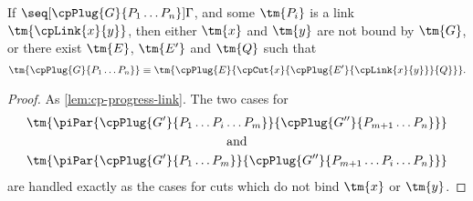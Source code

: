\begin{lemma}\label{lem:hcp-progress-link}
  If $\seq[{ \cpPlug{G}{P_1 \dots P_n} }]{ \Gamma }$, and some $\tm{P_i}$ is a
  link $\tm{\cpLink{x}{y}}$, then either $\tm{x}$ and $\tm{y}$ are not bound by
  $\tm{G}$, or there exist $\tm{E}$, $\tm{E'}$ and $\tm{Q}$ such that
  \begin{gather*}
    \tm{\cpPlug{G}{P_1 \dots P_n}} \equiv
    \tm{\cpPlug{E}{\cpCut{x}{\cpPlug{E'}{\cpLink{x}{y}}}{Q}}}.
  \end{gather*}
\end{lemma}
\begin{proof}
  As \cref{lem:cp-progress-link}. The two cases for
  \begin{gather*}
    \tm{\piPar{\cpPlug{G'}{P_1 \dots P_i \dots P_m}}{\cpPlug{G''}{P_{m+1} \dots P_n}}}\\
    \text{and}\\
    \tm{\piPar{\cpPlug{G'}{P_1 \dots P_m}}{\cpPlug{G''}{P_{m+1} \dots P_i \dots P_n}}}
  \end{gather*}
  are handled exactly as the cases for cuts which do not bind $\tm{x}$ or $\tm{y}$.
\end{proof}
